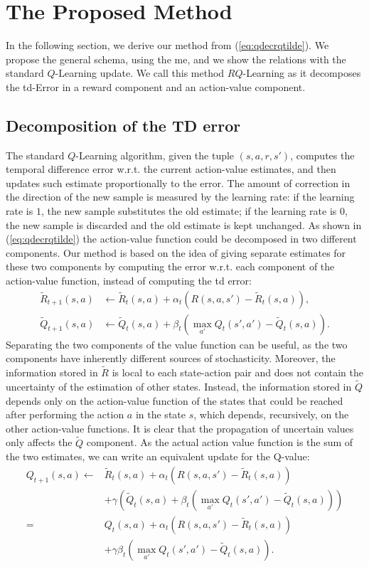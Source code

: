 \section{The Proposed Method}
In the following section, we derive our method from (\ref{eq:qdecrqtilde}). We propose the general schema, using the \gls{me}, and we show the relations with the standard $Q$-Learning update. We call this method $RQ$-Learning as it decomposes the \gls{td}-Error in a reward component and an action-value component.

\subsection{Decomposition of the TD error}
The standard $Q$-Learning algorithm, given the tuple $(s,a,r,s')$, computes the temporal difference error w.r.t. the current action-value estimates, and then updates such estimate proportionally to the error. The amount of correction in the direction of the new sample is measured by the learning rate: if the learning rate is $1$, the new sample substitutes the old estimate; if the learning rate is $0$, the new sample is discarded and the old estimate is kept unchanged. 
As shown in (\ref{eq:qdecrqtilde}) the action-value function could be decomposed in two different components. Our method is based on the idea of giving separate estimates for these two components by computing the error w.r.t. each component of the action-value function, instead of computing the \gls{td} error:
\begin{align}
\tilde{R}_{t+1}(s,a) & \leftarrow\tilde{R}_t(s,a)+\alpha_t(R(s,a,s')-\tilde{R}_t(s,a)), \label{eq:rtilupdedate}\\
\tilde{Q}_{t+1}(s,a) & \leftarrow\tilde{Q}_t(s,a)+\beta_t(\max_{a'}Q_t(s',a')-\tilde{Q}_t(s,a)).
\label{eq:qtildeupdate}
\end{align}
Separating the two components of the value function can be useful, as the two components have inherently different sources of stochasticity. Moreover, the information stored in $\tilde{R}$ is local to each state-action pair and does not contain the uncertainty of the estimation of other states. Instead, the information stored in $\tilde{Q}$ depends only on the action-value function of the states that could be reached after performing the action $a$ in the state $s$, which depends, recursively, on the other action-value functions. It is clear that the propagation of uncertain values only affects the $\tilde{Q}$ component.
As the actual action value function is the sum of the two estimates, we can write an equivalent update for the Q-value:
\begin{align}
Q_{t+1}(s,a)\leftarrow&\tilde{R}_t(s,a)+\alpha_t(R(s,a,s')-\tilde{R}_t(s,a)) \nonumber\\
  & +\gamma\left(\tilde{Q}_t(s,a)+\beta_t(\max_{a'}Q_t(s',a')-\tilde{Q}_t(s,a))\right) \nonumber\\
= & Q_t(s,a)+\alpha_t(R(s,a,s')-\tilde{R}_t(s,a)) \nonumber\\
  & +\gamma\beta_t(\max_{a'}Q_t(s',a')-\tilde{Q}_t(s,a)).
 \label{eq:cumulativeupdate}
\end{align}

